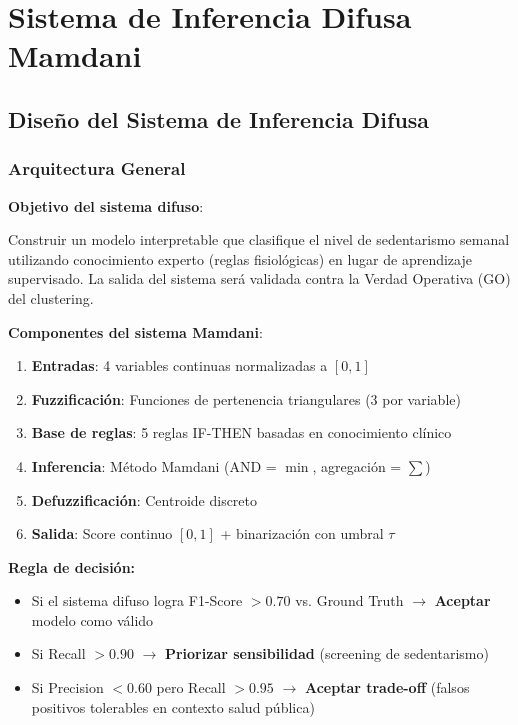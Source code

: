 \documentclass[12pt,letterpaper,twoside]{report}
\begin{document}
\chapter{Sistema de Inferencia Difusa Mamdani}

\section{Diseño del Sistema de Inferencia Difusa}

\subsection{Arquitectura General}

\begin{hipotesisbox}
\textbf{Objetivo del sistema difuso}:

Construir un modelo interpretable que clasifique el nivel de sedentarismo semanal utilizando conocimiento experto (reglas fisiológicas) en lugar de aprendizaje supervisado. La salida del sistema será validada contra la Verdad Operativa (GO) del clustering.
\end{hipotesisbox}

\begin{estadisticobox}
\textbf{Componentes del sistema Mamdani}:

\begin{enumerate}[noitemsep]
    \item \textbf{Entradas}: 4 variables continuas normalizadas a $[0,1]$
    \item \textbf{Fuzzificación}: Funciones de pertenencia triangulares (3 por variable)
    \item \textbf{Base de reglas}: 5 reglas IF-THEN basadas en conocimiento clínico
    \item \textbf{Inferencia}: Método Mamdani (AND = $\min$, agregación = $\sum$)
    \item \textbf{Defuzzificación}: Centroide discreto
    \item \textbf{Salida}: Score continuo $[0,1]$ + binarización con umbral $\tau$
\end{enumerate}
\end{estadisticobox}

\begin{reglabox}
\textbf{Regla de decisión:}

\begin{itemize}[noitemsep]
    \item Si el sistema difuso logra F1-Score $> 0.70$ vs. Ground Truth $\to$ \textbf{Aceptar} modelo como válido
    \item Si Recall $> 0.90$ $\to$ \textbf{Priorizar sensibilidad} (screening de sedentarismo)
    \item Si Precision $< 0.60$ pero Recall $> 0.95$ $\to$ \textbf{Aceptar trade-off} (falsos positivos tolerables en contexto salud pública)
\end{itemize}
\end{reglabox}
\end{document}
